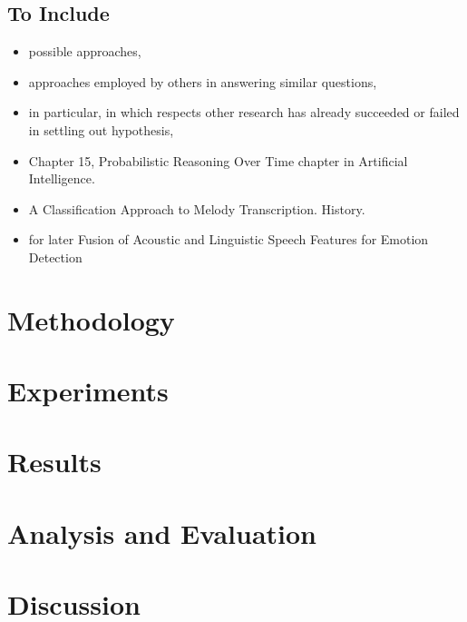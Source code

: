 \documentclass{article}
\begin{document}
 \subsection{To Include}
 \begin{itemize}
     \item possible approaches,
     \item approaches employed by others in answering similar questions,
     \item in particular, in which respects other research has already succeeded or failed in settling out hypothesis,
     \item \citep{Russell2009AIMA} Chapter 15, Probabilistic Reasoning Over Time chapter in Artificial Intelligence.
     \item \citep{Poliner2005CAMT} A Classification Approach to Melody Transcription. History.
     \item for later \citep{Metze2013FALFED} Fusion of Acoustic and Linguistic Speech Features for Emotion Detection

 \end{itemize}

\section{Methodology}

\section{Experiments}

\section{Results}

\section{Analysis and Evaluation}
\section{Discussion}

 
\end{document}
